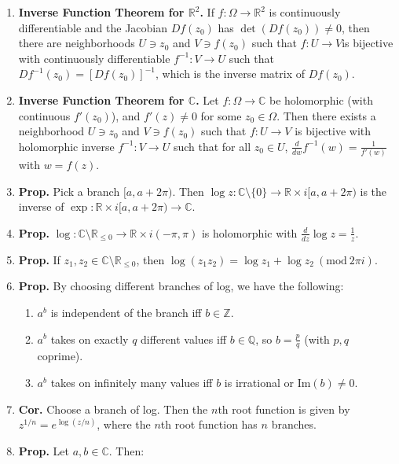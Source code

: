 \documentclass[11pt]{article}
\theoremstyle{definition}
\theoremstyle{named}
\newcommand{\Mod}[1]{\ (\mathrm{mod}\ #1)}
\begin{document}
\begin{enumerate}
\begin{enumerate}
    \end{enumerate}
    \item \textbf{Inverse Function Theorem for $\mathbb{R}^2$. } If $f: \Omega \to \mathbb{R}^2$ is continuously differentiable and the Jacobian $Df(z_0)$ has $\det(Df(z_0)) \neq 0$, then there are neighborhoods $U \ni z_0$ and $V \ni f(z_0)$ such that $f: U \to V$is bijective with continuously differentiable $f^{-1}: V \to U$ such that $Df^{-1}(z_0) = [Df(z_0)]^{-1}$, which is the inverse matrix of $Df(z_0)$. 
    \item \textbf{Inverse Function Theorem for $\mathbb{C}$. } Let $f: \Omega \to \mathbb{C}$ be holomorphic (with continuous $f'(z_0)$), and $f'(z) \neq 0$ for some $z_0 \in \Omega$. Then there exists a neighborhood $U \ni z_0$ and $V \ni f(z_0)$ such that $f: U \to V$ is bijective with holomorphic inverse $f^{-1}: V \to U$ such that for all $z_0 \in U$, $\frac{d}{dw} f^{-1}(w) = \frac{1}{f'(w)}$ with $w = f(z)$. 
    \item \textbf{Prop. } Pick a branch $[a, a+2\pi)$. Then $\log z: \mathbb{C} \setminus \{0\} \to \mathbb{R} \times i[a, a + 2\pi)$ is the inverse of $\exp: \mathbb{R} \times i[a, a+2\pi) \to \mathbb{C}$. 
    \item \textbf{Prop. } $\log: \mathbb{C} \setminus \mathbb{R}_{\leq 0} \to \mathbb{R} \times i(-\pi,\pi)$ is holomorphic with $\frac{d}{dz} \log z = \frac{1}{z}$. 
    \item \textbf{Prop. } If $z_1,z_2 \in \mathbb{C} \setminus \mathbb{R}_{\leq 0}$, then $\log(z_1z_2) = \log z_1 + \log z_2 \Mod{2\pi i}$. 
    \item \textbf{Prop. } By choosing different branches of log, we have the following: 
    \begin{enumerate}
        \item $a^b$ is independent of the branch iff $b \in \mathbb{Z}$. 
        \item $a^b$ takes on exactly $q$ different values iff $b \in \mathbb{Q}$, so $b = \frac{p}{q}$ (with $p,q$ coprime). 
        \item $a^b$ takes on infinitely many values iff $b$ is irrational or $\textrm{Im}(b) \neq 0$. 
    \end{enumerate}
    \item \textbf{Cor. } Choose a branch of log. Then the $n$th root function is given by $z^{1/n} = e^{\log (z/n)}$, where the $n$th root function has $n$ branches. 
    \item \textbf{Prop. } Let $a,b \in \mathbb{C}$. Then: 
    \begin{enumerate}

\end{enumerate}
\end{enumerate}
\end{document}
